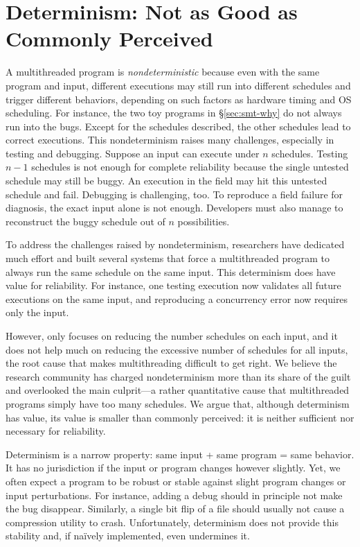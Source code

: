 \section{Determinism: Not as Good as Commonly Perceived} \label{sec:smt-dmt}

A multithreaded program is \emph{nondeterministic} because even with the same
program and input, different executions may still run into different schedules
and trigger different behaviors, depending on such factors as hardware timing
and OS scheduling. For instance, the two toy programs in \S\ref{sec:smt-why}
do not always run into the bugs.  Except for the schedules described, the
other schedules lead to correct executions. This nondeterminism raises many
challenges, especially in testing and debugging.  Suppose an input can execute
under $n$ schedules. Testing $n-1$ schedules is not enough for complete
reliability because the single untested schedule may still be buggy.  An
execution in the field may hit this untested schedule and fail.  Debugging is
challenging, too. To reproduce a field failure for diagnosis, the exact input
alone is not enough. Developers must also manage to reconstruct the buggy
schedule out of $n$ possibilities.

To address the challenges raised by nondeterminism, researchers have dedicated
much effort and built several \dmt systems
that force a multithreaded program to always run the same schedule on the same
input.  This determinism does have value for reliability.  For instance, one
testing execution now validates all future executions on the same input, and 
reproducing a concurrency error now requires only the input.

However, \dmt only focuses on reducing the number schedules on each input, and
it does not help much on reducing the excessive number of schedules for all 
inputs, the root cause that makes multithreading difficult to get right.  We 
believe the research community has charged nondeterminism more
than its share of the guilt and overlooked the main culprit---a rather
quantitative cause that multithreaded programs simply have too many schedules.
We argue that, although determinism has value, its value is smaller than
commonly perceived: it is neither sufficient nor necessary for reliability.

 Determinism is a
narrow property: same input + same program = same behavior. It has no
jurisdiction if the input or program changes however slightly.  Yet, we
often expect a program to be robust or stable against slight program
changes or input perturbations.  For instance, adding a debug 
should in principle not make the bug disappear.  Similarly, a single bit flip of
a file should usually not cause a compression utility to crash. Unfortunately,
determinism does not provide this stability and, if na\"{i}vely implemented,
even undermines it.

